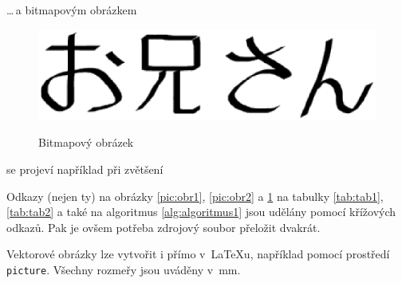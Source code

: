 \documentclass[a4paper, 11pt]{article}
\begin{document}
\noindent\ldots\,a bitmapovým obrázkem

\begin{figure}[h]
\begin{center}
  \scalebox{0.6}
  {
    \includegraphics{oniisan2.eps}
  }
  \caption{Bitmapový obrázek}
  \label{pic:obr3}
\end{center}
\end{figure}

 se projeví například při zvětšení


Odkazy (nejen ty) na obrázky \ref{pic:obr1}, \ref{pic:obr2} a \ref{pic:obr3} na tabulky \ref{tab:tab1}, \ref{tab:tab2} a také na algoritmus \ref{alg:algoritmus1} jsou udělány pomocí křížových odkazů. Pak je ovšem potřeba zdrojový soubor přeložit dvakrát.

Vektorové obrázky lze vytvořit i přímo v~\LaTeX u, například pomocí prostředí \texttt{picture}. Všechny rozmeřy jsou uváděny v~mm.

\newpage
\end{document}
